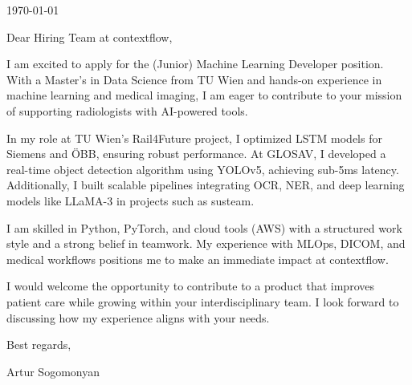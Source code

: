 \documentclass{ExpressiveCoverLetter}
\begin{document}
\coverletterheader[
    firstname=Artur,
    lastname=Sogomonyan,
    email=arthur.sogomonyan@gmail.com,
    phone=+43 677 64114581,
    linkedin=artur-sogomonyan,
    github=PropovedNik007,
    website=arterra,
    city=Vienna,
    state=Austria
]

\vspace{0.25in}
\today
\vspace{0.15in}

Dear Hiring Team at contextflow,

I am excited to apply for the (Junior) Machine Learning Developer position. With a Master’s in Data Science from TU Wien and hands-on experience in machine learning and medical imaging, I am eager to contribute to your mission of supporting radiologists with AI-powered tools.

In my role at TU Wien’s Rail4Future project, I optimized LSTM models for Siemens and ÖBB, ensuring robust performance. At GLOSAV, I developed a real-time object detection algorithm using YOLOv5, achieving sub-5ms latency. Additionally, I built scalable pipelines integrating OCR, NER, and deep learning models like LLaMA-3 in projects such as susteam.

I am skilled in Python, PyTorch, and cloud tools (AWS) with a structured work style and a strong belief in teamwork. My experience with MLOps, DICOM, and medical workflows positions me to make an immediate impact at contextflow.

I would welcome the opportunity to contribute to a product that improves patient care while growing within your interdisciplinary team. I look forward to discussing how my experience aligns with your needs.

Best regards,

\vspace{.01in}

Artur Sogomonyan
\end{document}
